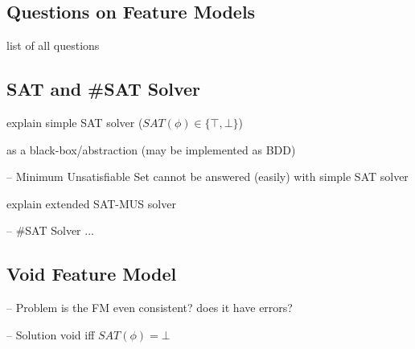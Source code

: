 






\subsection{Questions on Feature Models}

list of all questions

\subsection{SAT and \#SAT Solver}
explain simple SAT solver ($SAT(\phi) \in \{\top, \bot\}$)

as a black-box/abstraction (may be implemented as BDD)

\begin{frame}{-- Minimum Unsatisfiable Set}
    cannot be answered (easily) with simple SAT solver

    explain extended SAT-MUS solver
\end{frame}

\begin{frame}{-- \#SAT Solver}
    ...
\end{frame}

\subsection{Void Feature Model}
\begin{frame}{-- Problem}
    is the FM even consistent? does it have errors? %
\end{frame}
\begin{frame}{-- Solution}
    void iff $SAT(\phi) = \bot$
\end{frame}

